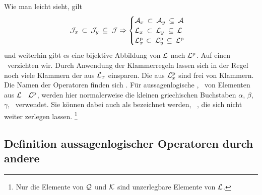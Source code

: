 Wie man leicht sieht, gilt
\begin{equation}
	\mathcal{J}_x      \: \subset \: \mathcal{J}_y  \: \subseteq \: \mathcal{J} \Rightarrow
	\begin{cases}
		\mathcal{A}_x  \: \subset \: \mathcal{A}_y  \: \subseteq \: \mathcal{A} \\
		\mathcal{L}_x  \; \subset \: \mathcal{L}_y  \; \subseteq \: \mathcal{L} \\
		\mathcal{L}^\mathrm{p}_x \, \subset \: \mathcal{L}^\mathrm{p}_y \, \subseteq \: \mathcal{L}^\mathrm{p}
	\end{cases}
\end{equation}
und weiterhin gibt es eine bijektive Abbildung von $\mathcal{L}$ nach $\mathcal{L}^\mathrm{p}$. Auf einen \Beweis\ verzichten wir.
%
Durch Anwendung der Klammerregeln  lassen sich in der Regel noch viele Klammern der  aus $\mathcal{L}_x$ einsparen.
Die  aus $\mathcal{L}^\mathrm{p}_x$ sind frei von Klammern.
Die Namen der Operatoren finden sich .
Für aussagenlogische , \textdh\ von Elementen aus $\mathcal{L}$ \textbzgl\ $\mathcal{L}^\mathrm{p}$, werden hier normalerweise die kleinen griechischen Buchstaben $\alpha$, $\beta$, $\gamma$, \textusw\ verwendet.
Sie können dabei auch als  bezeichnet werden, \textdh\ , die sich nicht weiter zerlegen lassen.%
\footnote{%
	Nur die Elemente von $\mathcal{Q}$ und $\mathcal{K}$ sind unzerlegbare Elemente von $\mathcal{L}$.
}

\subsection{Definition aussagenlogischer Operatoren durch andere}%
\label{sub:ausOperatorDef}

